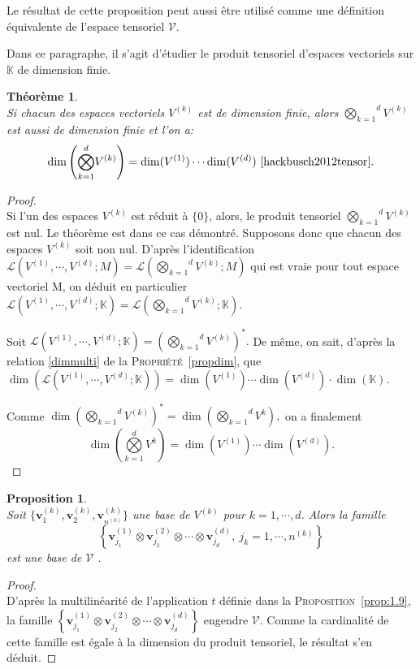 \documentclass[11pt,a4paper,oneside]{book}
\newtheorem{prop}{Proposition}[chapter]
\newtheorem{theo}{Théorème}[chapter]
\newtheorem{proof}{Démonstration}
\def\K{\mathbb K}
\def\L{\mathcal L}
\def\V{\mathcal V}
\def\v{\mathbf v}
\def\gktensor{\overset{d}{\underset{k=1}{\bigotimes}}}
\newcommand{\propref}[1]{\textsc{Proposition}~\ref{#1}}
\newcommand{\proppref}[1]{\textsc{Propriété}~\ref{#1}}
\begin{document}
Le résultat de cette proposition peut aussi être utilisé comme une définition équivalente de l'espace tensoriel $\V$.

Dans ce paragraphe, il s'agit d'étudier le produit tensoriel d'espaces vectoriels sur $ \K $ de dimension finie.
\begin{theo}
	\emph{\\}
Si chacun des espaces vectoriels $ V^{(k)} $ est de dimension finie, alors $\gktensor V^{(k)} $ est aussi de dimension finie et l'on a:
\begin{equation*}
\dim \left(\gktensor V^{(k)}\right)=\dim(V^{(1)})\cdots \dim(V^{(d)})  \text{ \cite[p.53]{hackbusch2012tensor}}.
\end{equation*}

\end{theo} 
\begin{proof}
	\emph{\\}
Si l'un des espaces $ V^{(k)} $ est réduit à $ \{0\} $, alors, le produit tensoriel $ \gktensor V^{(k)} $ est nul. Le théorème est dans ce cas démontré. Supposons donc que chacun des espaces $ V^{(k)} $ soit non nul. D'après l'identification $ \L\left(V^{(1)},\cdots,V^{(d)};M\right)=\L\left(\gktensor V^{(k)};M\right)  $ qui est vraie pour tout espace vectoriel M, on déduit en particulier $ \L\left(V^{(1)},\cdots,V^{(d)};\K\right)=\L\left(\gktensor V^{(k)};\K\right)  $. 

Soit $ \L\left(V^{(1)},\cdots,V^{(d)};\K\right)=\left(\gktensor V^{(k)}\right)^{*}.$ De même, on sait, d'après la relation \eqref{dimmulti} de la  \proppref{propdim},  que $ \dim\left(\L(V^{(1)},\cdots,V^{(d)};\K)\right)=\dim\left(V^{(1)}\right)\cdots \dim \left(V^{(d)}\right)\cdot \dim(\K). $

 Comme $ \dim\left(\gktensor V^{(k)}\right)^{*}=\dim \left(\gktensor V^{k}\right), $ on a finalement 
 \begin{equation*}
 \dim\left(\gktensor V^{k}\right)=\dim\left(V^{(1)}\right)\cdots \dim \left(V^{(d)}\right).
 \end{equation*}

 \end{proof}
\begin{prop}
\emph{\\}
Soit $ \{\v_{1}^{(k)},\v_{2}^{(k)},\v_{n^{(k)}}^{(k)}\} $ une base de $ V^{(k)} $ pour $ k=1,\cdots,d $. Alors la famille $$\left\{\v_{j_{1}}^{(1)}\otimes \v_{j_{2}}^{(2)}\otimes\cdots\otimes \v_{j_{d}}^{(d)},\: j_{k}=1,\cdots,n^{(k)}\right\} $$ est une base de $ \V $ \cite[p.128]{Michel2013}.
\end{prop}
\begin{proof}
\emph{\\}
D'après la multilinéarité de l'application $ t $ définie dans la  \propref{prop:1.9}, la famille $ \left\{\v_{j_{1}}^{(1)}\otimes \v_{j_{2}}^{(2)}\otimes\cdots\otimes \v_{j_{d}}^{(d)}\right\} $ engendre $ \V $. Comme la cardinalité de cette  famille est égale à la dimension du produit tensoriel, le résultat s'en déduit.
\end{proof}
\end{document}
